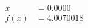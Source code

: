 \documentclass[preview]{standalone}
\begin{document}
\begin{align*}
x &= 0.0000\\f(x) &= 4.0070018
\end{align*}
\end{document}
